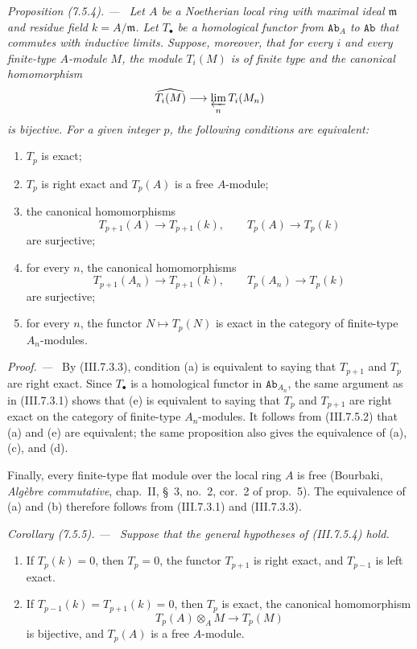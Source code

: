 \documentclass[10pt,oneside]{book}
\newcommand{\cat}[1]{\mathtt{#1}}
\newcommand{\sref}[2][]{(#2)}
\newenvironment{proposition}[1][]{\par\medskip\noindent\itshape Proposition (#1). ---\ }{\par}
\newenvironment{corollary}[1][]{\par\medskip\noindent\itshape Corollary (#1). ---\ }{\par}
\newenvironment{proof}{\par\medskip\noindent\textit{Proof. ---\ }}{\par}
\begin{document}
\begin{proposition}[7.5.4]
\label{III.7.5.4}
Let $A$ be a Noetherian local ring with maximal ideal
$\mathfrak m$ and residue field $k=A/\mathfrak m$.  Let
$T_\bullet$ be a homological functor from $\cat{Ab}_A$ to
$\cat{Ab}$ that commutes with inductive limits.  Suppose,
moreover, that for every $i$ and every finite-type $A$-module
$M$, the module $T_i(M)$ is of finite type and the canonical
homomorphism
\[
  \widehat{T_i(M)}
  \longrightarrow
  \varprojlim_n T_i(M_n)
\]
is bijective.  For a given integer $p$, the following
conditions are equivalent:
\begin{enumerate}
  \item[(a)] $T_p$ is exact;
  \item[(b)] $T_p$ is right exact and $T_p(A)$ is a free
    $A$-module;
  \item[(c)] the canonical homomorphisms
    \[
      T_{p+1}(A)\longrightarrow T_{p+1}(k),
      \qquad
      T_p(A)\longrightarrow T_p(k)
    \]
    are surjective;
  \item[(d)] for every $n$, the canonical homomorphisms
    \[
      T_{p+1}(A_n)\longrightarrow T_{p+1}(k),
      \qquad
      T_p(A_n)\longrightarrow T_p(k)
    \]
    are surjective;
  \item[(e)] for every $n$, the functor $N\mapsto T_p(N)$ is
    exact in the category of finite-type $A_n$-modules.
\end{enumerate}
\end{proposition}

\begin{proof}
By \sref{III.7.3.3}, condition (a) is equivalent to saying
that $T_{p+1}$ and $T_p$ are right exact.  Since
$T_\bullet$ is a homological functor in $\cat{Ab}_{A_n}$, the
same argument as in \sref{III.7.3.1} shows that (e) is
equivalent to saying that $T_p$ and $T_{p+1}$ are right exact
on the category of finite-type $A_n$-modules.  It follows from
\sref{III.7.5.2} that (a) and (e) are equivalent; the same
proposition also gives the equivalence of (a), (c), and (d).

Finally, every finite-type flat module over the local ring
$A$ is free (Bourbaki, \emph{Alg\`ebre commutative},
chap.~II, \S~3, no.~2, cor.~2 of prop.~5).  The equivalence
of (a) and (b) therefore follows from \sref{III.7.3.1} and
\sref{III.7.3.3}.
\end{proof}

\begin{corollary}[7.5.5]
\label{III.7.5.5}
Suppose that the general hypotheses of \sref{III.7.5.4} hold.
\begin{enumerate}
  \item[(i)] If $T_p(k)=0$, then $T_p=0$, the functor
    $T_{p+1}$ is right exact, and $T_{p-1}$ is left exact.
  \item[(ii)] If $T_{p-1}(k)=T_{p+1}(k)=0$, then $T_p$ is
    exact, the canonical homomorphism
    \[
      T_p(A)\otimes_A M
      \longrightarrow
      T_p(M)
    \]
    is bijective, and $T_p(A)$ is a free $A$-module.
\end{enumerate}
\end{corollary}
\end{document}
